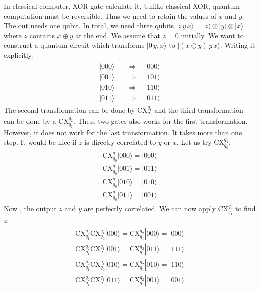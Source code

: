\documentclass[letterpaper,10pt,english]{jupyterBook}
\begin{document}
\sphinxAtStartPar
In classical computer, XOR gate calculate it. Unlike classical XOR, quantum computation must be reversible.  Thus we need to retain the values of \(x\) and \(y\). The out needs one qubit.  In total, we need three qubits
\(|z\,y\,x\rangle = |z\rangle \otimes |y\rangle \otimes |x\rangle\) where \(z\) contains \(x \oplus y\) at the end.  We assume that \(z=0\) initially.  We want to construct a quantum circuit which transforms \(|0\,y,x\rangle\) to \(|(x \oplus y)\, y\, x\rangle\).  Writing it explicitly.
\begin{equation*}
\begin{split}
\begin{align}
|000\rangle \quad &\Rightarrow \quad |000\rangle \\
|001\rangle \quad &\Rightarrow \quad |101\rangle \\
|010\rangle \quad &\Rightarrow \quad |110\rangle \\
|011\rangle \quad &\Rightarrow \quad |011\rangle
\end{align}
\end{split}
\end{equation*}
\sphinxAtStartPar
The second transformation can be done by CX\(_{q_0}^{q_1}\) and the third transformation can be done by a CX\(_{q_1}^{q_2}\). These two gates also works for the first transformation.  However, it does not work for the last transformation.  It takes more than one step.  It would be nice if \(z\) is directly correlated to \(y\) or \(x\). Let us try CX\(_{q_0}^{q_1}\).
\begin{equation*}
\begin{split}
\begin{align}
\text{CX}_{q_0}^{q_1}|000\rangle = |000\rangle \\
\text{CX}_{q_0}^{q_1}|001\rangle = |011\rangle \\
\text{CX}_{q_0}^{q_1}|010\rangle = |010\rangle \\
\text{CX}_{q_0}^{q_1}|011\rangle = |001\rangle
\end{align}
\end{split}
\end{equation*}
\sphinxAtStartPar
Now , the output \(z\) and \(y\) are perfectly correlated.  We can now apply CX\(_{q_1}^{q_2}\) to find \(z\).
\begin{equation*}
\begin{split}
\begin{align}
\text{CX}_{q_1}^{q_2}\text{CX}_{q_0}^{q_1}|000\rangle = \text{CX}_{q_1}^{q_2}|000\rangle = |000\rangle  \\
\text{CX}_{q_1}^{q_2}\text{CX}_{q_0}^{q_1}|001\rangle = \text{CX}_{q_1}^{q_2}|011\rangle = |111\rangle \\
\text{CX}_{q_1}^{q_2}\text{CX}_{q_0}^{q_1}|010\rangle = \text{CX}_{q_1}^{q_2}|010\rangle = |110\rangle \\
\text{CX}_{q_1}^{q_2}\text{CX}_{q_0}^{q_1}|011\rangle = \text{CX}_{q_1}^{q_2}|001\rangle = |001\rangle
\end{align}
\end{split}
\end{equation*}
\end{document}
